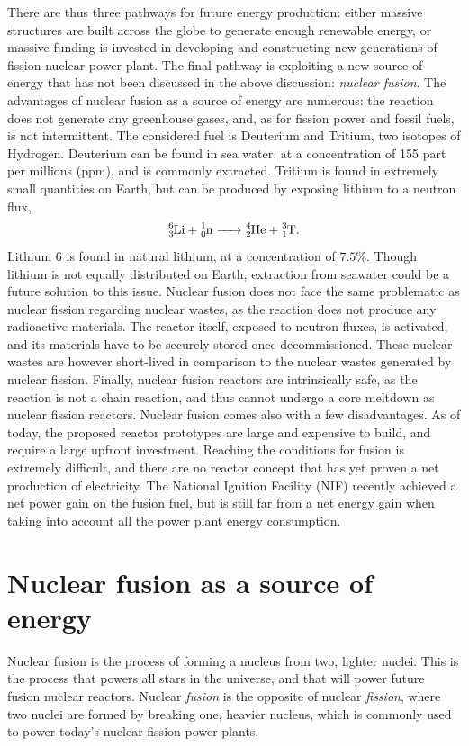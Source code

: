 \documentclass[my_thesis.tex]{subfiles}
\begin{document}
There are thus three pathways for future energy production: either massive structures are built across the globe to generate enough renewable energy, or massive funding is invested in developing and constructing new generations of fission nuclear power plant. The final pathway is exploiting a new source of energy that has not been discussed in the above discussion: \emph{nuclear fusion}. The advantages of nuclear fusion as a source of energy are numerous: the reaction does not generate any greenhouse gases, and, as for fission power and fossil fuels, is not intermittent. The considered fuel is Deuterium and Tritium, two isotopes of Hydrogen. Deuterium can be found in sea water, at a concentration of 155 part per millions (ppm), and is commonly extracted. Tritium is found in extremely small quantities on Earth, but can be produced by exposing lithium to a neutron flux,
\begin{equation}
    \ce{^{6}_{3}Li + ^{1}_{0}n -> ^{4}_{2}He + ^{3}_{1}T}.
\end{equation}
Lithium 6 is found in natural lithium, at a concentration of $7.5\%$. Though lithium is not equally distributed on Earth, extraction from seawater \citep{ZHAO2019113389} could be a future solution to this issue. Nuclear fusion does not face the same problematic as nuclear fission regarding nuclear wastes, as the reaction does not produce any radioactive materials. The reactor itself, exposed to neutron fluxes, is activated, and its materials have to be securely stored once decommissioned. These nuclear wastes are however short-lived in comparison to the nuclear wastes generated by nuclear fission. Finally, nuclear fusion reactors are intrinsically safe, as the reaction is not a chain reaction, and thus cannot undergo a core meltdown as nuclear fission reactors. Nuclear fusion comes also with a few disadvantages. As of today, the proposed reactor prototypes are large and expensive to build, and require a large upfront investment. Reaching the conditions for fusion is extremely difficult, and there are no reactor concept that has yet proven a net production of electricity. The National Ignition Facility (NIF) recently achieved a net power gain \citep{nif_source} on the fusion fuel, but is still far from a net energy gain when taking into account all the power plant energy consumption.

\section{Nuclear fusion as a source of energy}
Nuclear fusion is the process of forming a nucleus from two, lighter nuclei. This is the process that powers all stars in the universe, and that will power future fusion nuclear reactors. Nuclear \emph{fusion} is the opposite of nuclear \emph{fission}, where two nuclei are formed by breaking one, heavier nucleus, which is commonly used to power today's nuclear fission power plants.
\end{document}
